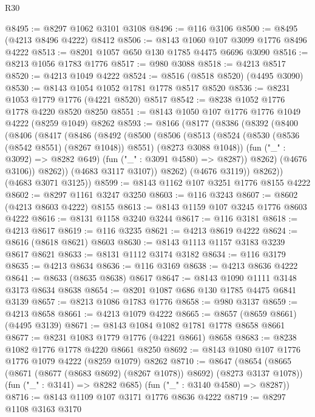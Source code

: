 \begin{lexlean}{R30}
\begin{coremodule}
@8495 := @8297 @1062 @3101 @3108
@8496 := @116 @3106
@8500 := @8495 (@4213 @8496 @4222) @8412
@8506 := @8143 @1060 @107 @3099 @1776 @8496 @4222
@8513 := @8201 @1057 @650 @130 @1785 @4475 @6696 @3090
@8516 := @8213 @1056 @1783 @1776
@8517 := @980 @3088
@8518 := @4213 @8517
@8520 := @4213 @1049 @4222
@8524 := @8516 (@8518 @8520) (@4495 @3090)
@8530 := @8143 @1054 @1052 @1781 @1778 @8517 @8520
@8536 := @8231 @1053 @1779 @1776 (@4221 @8520) @8517
@8542 := @8238 @1052 @1776 @1778 @4220 @8520 @8250
@8551 := @8143 @1050 @107 @1776 @1776 @1049 @4222 (@8259 @1049) @8262
@8593 := @8166
    (@8177
      (@8386
        (@8392
          (@8400
            (@8406
              (@8417
                (@8486
                  (@8492
                    (@8500
                      (@8506
                        (@8513
                          (@8524
                            (@8530 (@8536 (@8542 @8551) (@8267 @1048)) @8551)
                            (@8273 @3088 @1048))
                          (fun ("_" : @3092) => @8282 @649)
                          (fun ("_" : @3091 @4580) => @8287))
                        @8262)
                      (@4676 @3106))
                    @8262))
                (@4683 @3117 @3107))
              @8262)
            (@4676 @3119))
          @8262))
      (@4683 @3071 @3125))
@8599 := @8143 @1162 @107 @3251 @1776 @8155 @4222
@8602 := @8297 @1161 @3247 @3250
@8603 := @116 @3243
@8607 := @8602 (@4213 @8603 @4222) @8155
@8613 := @8143 @1159 @107 @3245 @1776 @8603 @4222
@8616 := @8131 @1158 @3240 @3244
@8617 := @116 @3181
@8618 := @4213 @8617
@8619 := @116 @3235
@8621 := @4213 @8619 @4222
@8624 := @8616 (@8618 @8621) @8603
@8630 := @8143 @1113 @1157 @3183 @3239 @8617 @8621
@8633 := @8131 @1112 @3174 @3182
@8634 := @116 @3179
@8635 := @4213 @8634
@8636 := @116 @3169
@8638 := @4213 @8636 @4222
@8641 := @8633 (@8635 @8638) @8617
@8647 := @8143 @1090 @1111 @3148 @3173 @8634 @8638
@8654 := @8201 @1087 @686 @130 @1785 @4475 @6841 @3139
@8657 := @8213 @1086 @1783 @1776
@8658 := @980 @3137
@8659 := @4213 @8658
@8661 := @4213 @1079 @4222
@8665 := @8657 (@8659 @8661) (@4495 @3139)
@8671 := @8143 @1084 @1082 @1781 @1778 @8658 @8661
@8677 := @8231 @1083 @1779 @1776 (@4221 @8661) @8658
@8683 := @8238 @1082 @1776 @1778 @4220 @8661 @8250
@8692 := @8143 @1080 @107 @1776 @1776 @1079 @4222 (@8259 @1079) @8262
@8710 := @8647
    (@8654
      (@8665 (@8671 (@8677 (@8683 @8692) (@8267 @1078)) @8692) (@8273 @3137 @1078))
      (fun ("_" : @3141) => @8282 @685)
      (fun ("_" : @3140 @4580) => @8287))
@8716 := @8143 @1109 @107 @3171 @1776 @8636 @4222
@8719 := @8297 @1108 @3163 @3170

\end{coremodule}
\end{lexlean}
